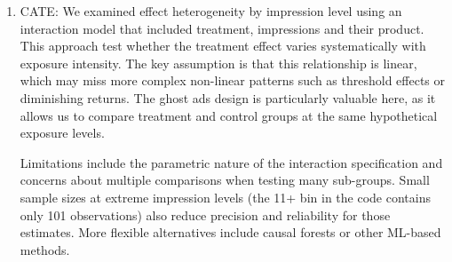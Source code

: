 \documentclass[10pt]{article}
\begin{document}
\begin{enumerate}
\begin{enumerate}
        The main limitation to LATE is that it identifies the causal effect only for compliers (those who see ads when assigned to treatment and don't see ads when assigned to control). This effect may not generalize to never-takers, whose response to ads whe cannot observe. The exclusion restriction is fundamentally untestable and could be violated if merely being part of an experiment affects behavior independently of ad exposure. Alternative approaches include bounds analysis, which relaxes assumptions at the cost of wider intervals, or principal stratification methods. 
        \item CATE: We examined effect heterogeneity by impression level using an interaction model that included treatment, impressions and their product. This approach test whether the treatment effect varies systematically with exposure intensity. The key assumption is that this relationship is linear, which may miss more complex non-linear patterns such as threshold effects or diminishing returns. The ghost ads design is particularly valuable here, as it allows us to compare treatment and control groups at the same hypothetical exposure levels. 
        
        Limitations include the parametric nature of the interaction specification and concerns about multiple comparisons when testing many sub-groups. Small sample sizes at extreme impression levels (the 11+ bin in the code contains only 101 observations) also reduce precision and reliability for those estimates. More flexible alternatives include causal forests or other ML-based methods. 


\end{enumerate}
\end{enumerate}
\end{document}
